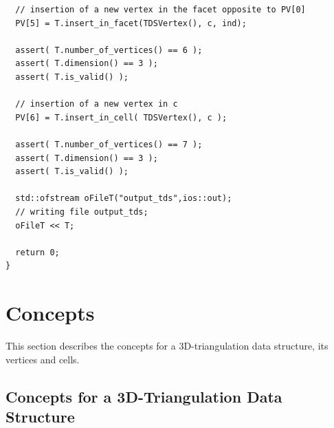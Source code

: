 \begin{verbatim}
  // insertion of a new vertex in the facet opposite to PV[0]
  PV[5] = T.insert_in_facet(TDSVertex(), c, ind);
  
  assert( T.number_of_vertices() == 6 );
  assert( T.dimension() == 3 );
  assert( T.is_valid() );

  // insertion of a new vertex in c
  PV[6] = T.insert_in_cell( TDSVertex(), c );

  assert( T.number_of_vertices() == 7 );
  assert( T.dimension() == 3 );
  assert( T.is_valid() );

  std::ofstream oFileT("output_tds",ios::out);
  // writing file output_tds; 
  oFileT << T; 

  return 0;
}
\end{verbatim}

\clearpage

\section{Concepts}

This section describes the concepts for a 3D-triangulation data
structure, its vertices and cells.

\subsection{Concepts for a 3D-Triangulation Data Structure}
\label{TDS3-sec-concept} 

